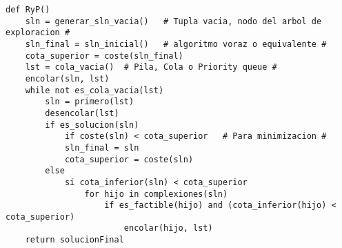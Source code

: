 \documentclass[tikz,11pt,fleqn]{book} %
\begin{document}
\begin{lstlisting}
def RyP()
    sln = generar_sln_vacia()   # Tupla vacia, nodo del arbol de exploracion #
    sln_final = sln_inicial()   # algoritmo voraz o equivalente #
    cota_superior = coste(sln_final)
    lst = cola_vacia()  # Pila, Cola o Priority queue #
    encolar(sln, lst)
    while not es_cola_vacia(lst)
        sln = primero(lst)
        desencolar(lst)
        if es_solucion(sln)
            if coste(sln) < cota_superior   # Para minimizacion #
            sln_final = sln
            cota_superior = coste(sln)
        else
            si cota_inferior(sln) < cota_superior
                for hijo in complexiones(sln)
                    if es_factible(hijo) and (cota_inferior(hijo) < cota_superior)
                        encolar(hijo, lst)
    return solucionFinal
\end{lstlisting}
\end{document}
